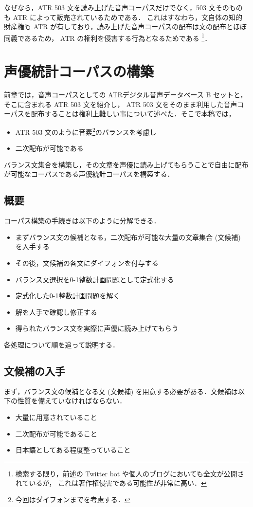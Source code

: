 \documentclass[final,10pt,twocolumn,3p,times,fleqn]{elsarticle}
\begin{document}
  なぜなら，ATR 503 文を読み上げた音声コーパスだけでなく，503 文そのものも ATR によって販売されているためである．
  これはすなわち，文自体の知的財産権も ATR が有しており，読み上げた音声コーパスの配布は文の配布とほぼ同義であるため，
  ATR の権利を侵害する行為となるためである
  \footnote{検索する限り，前述の Twitter bot や個人のブログにおいても全文が公開されているが，
 これは著作権侵害である可能性が非常に高い．}．
 
  \section{声優統計コーパスの構築}
  前章では，音声コーパスとしての ATRデジタル音声データベース B セットと，そこに含まれる ATR 503 文を紹介し，
  ATR 503 文をそのまま利用した音声コーパスを配布することは権利上難しい事について述べた．そこで本稿では，
  \begin{itemize}
   \item ATR 503 文のように音素\footnote{今回はダイフォンまでを考慮する．}のバランスを考慮し
   \item 二次配布が可能である
  \end{itemize}
  バランス文集合を構築し，その文章を声優に読み上げてもらうことで自由に配布が可能なコーパスである声優統計コーパスを構築する．

  \subsection{概要}
  コーパス構築の手続きは以下のように分解できる．
  \begin{itemize}
   \item まずバランス文の候補となる，二次配布が可能な大量の文章集合 (文候補) を入手する
   \item その後，文候補の各文にダイフォンを付与する
   \item バランス文選択を0-1整数計画問題として定式化する
   \item 定式化した0-1整数計画問題を解く
   \item 解を人手で確認し修正する
   \item 得られたバランス文を実際に声優に読み上げてもらう
  \end{itemize}

  各処理について順を追って説明する．

  \subsection{文候補の入手}
  まず，バランス文の候補となる文 (文候補) を用意する必要がある．文候補は以下の性質を備えていなければならない．
  \begin{itemize}
   \item 大量に用意されていること
   \item 二次配布が可能であること
   \item 日本語としてある程度整っていること
  \end{itemize}
\end{document}
